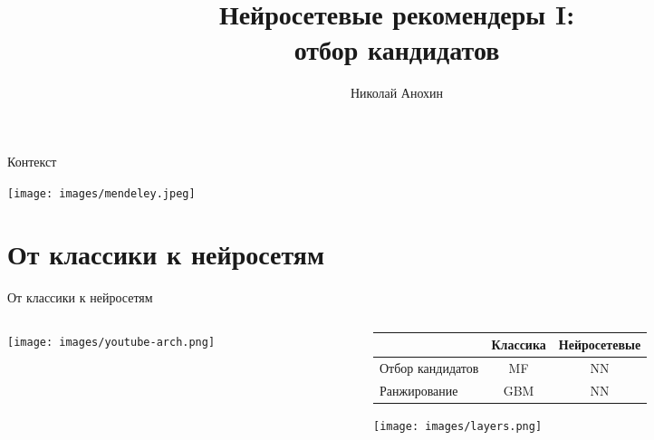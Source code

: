 \documentclass[11pt,aspectratio=169,handout]{beamer}
\author{Николай Анохин}
\title{Нейросетевые рекомендеры I: \\ отбор кандидатов}
\begin{document}
{

\begin{frame}
\titlepage
\end{frame}


}

\begin{frame}{Контекст}

\begin{center}
\texttt{[image: images/mendeley.jpeg]}
\end{center}

\end{frame}

\section{От классики к нейросетям}

\begin{frame}{От классики к нейросетям}

\begin{columns}
\begin{column}{0.4\textwidth} 
\begin{center}
\texttt{[image: images/youtube-arch.png]}
\end{center}
\end{column}
\begin{column}{0.5\textwidth}

\begin{small}
\begin{tabular}{l c c}
 & Классика & Нейросетевые \\
\hline
Отбор кандидатов & MF & NN \\
Ранжирование & GBM & NN
\end{tabular}

\begin{center}
\texttt{[image: images/layers.png]}
\end{center}

\end{small}

\end{column}
\end{columns}

\end{frame}
\end{document}
